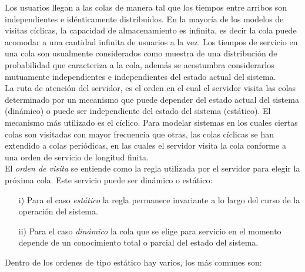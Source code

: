 \documentclass{article}
\numberwithin{equation}{section}
\begin{document}
Los usuarios llegan a las colas de manera tal que los tiempos entre arribos son independientes e id\'enticamente distribuidos. En la mayor\'ia de los modelos de visitas c\'iclicas, la capacidad de almacenamiento es infinita, es decir la cola puede acomodar a una cantidad infinita de usuarios a la vez. Los tiempos de servicio en una cola son usualmente considerados como muestra de una distribuci\'on de probabilidad que caracteriza a la cola, adem\'as se acostumbra considerarlos mutuamente independientes e independientes del estado actual del sistema. \\

La ruta de atenci\'on del servidor, es el orden en el cual el servidor visita las colas determinado por un mecanismo que puede depender del estado actual del sistema (din\'amico) o puede ser independiente del estado del sistema (est\'atico). El mecanismo m\'as utilizado es el c\'iclico. Para modelar sistemas en los cuales ciertas colas son visitadas con mayor frecuencia que otras, las colas c\'iclicas se han extendido a colas peri\'odicas, en las cuales el servidor visita la cola conforme a una orden de servicio de longitud finita. \\

El {\em orden de visita} se entiende como la regla utilizada por el servidor para elegir la pr\'oxima cola. Este servicio puede ser din\'amico o est\'atico:

\begin{itemize}
\item[i)] Para el caso {\em est\'atico} la regla permanece invariante a lo largo del curso de la operaci\'on del sistema.

\item[ii)] Para el caso {\em din\'amico} la cola que se elige para servicio en el momento depende de un conocimiento total o parcial del estado del sistema.
\end{itemize}

Dentro de los ordenes de tipo est\'atico hay varios, los m\'as comunes son:
\end{document}
